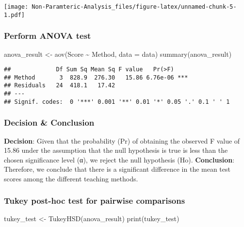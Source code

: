 \documentclass[
]{article}
\newenvironment{Shaded}{\begin{snugshade}}{\end{snugshade}}
\newcommand{\AttributeTok}[1]{\textcolor[rgb]{0.77,0.63,0.00}{#1}}
\newcommand{\FunctionTok}[1]{\textcolor[rgb]{0.00,0.00,0.00}{#1}}
\newcommand{\NormalTok}[1]{#1}
\newcommand{\OtherTok}[1]{\textcolor[rgb]{0.56,0.35,0.01}{#1}}
\newcommand{\SpecialCharTok}[1]{\textcolor[rgb]{0.00,0.00,0.00}{#1}}
\begin{document}
\texttt{[image: Non-Paramteric-Analysis\_files/figure-latex/unnamed-chunk-5-1.pdf]}

\hypertarget{perform-anova-test}{%
\subsubsection{Perform ANOVA test}\label{perform-anova-test}}

\begin{Shaded}
\begin{Highlighting}[]
\NormalTok{anova\_result }\OtherTok{\textless{}{-}} \FunctionTok{aov}\NormalTok{(Score }\SpecialCharTok{\textasciitilde{}}\NormalTok{ Method, }\AttributeTok{data =}\NormalTok{ data)}
\FunctionTok{summary}\NormalTok{(anova\_result)}
\end{Highlighting}
\end{Shaded}

\begin{verbatim}
##             Df Sum Sq Mean Sq F value   Pr(>F)    
## Method       3  828.9  276.30   15.86 6.76e-06 ***
## Residuals   24  418.1   17.42                     
## ---
## Signif. codes:  0 '***' 0.001 '**' 0.01 '*' 0.05 '.' 0.1 ' ' 1
\end{verbatim}

\hypertarget{decision-conclusion}{%
\subsubsection{Decision \& Conclusion}\label{decision-conclusion}}

\textbf{Decision}: Given that the probability (Pr) of obtaining the
observed F value of 15.86 under the assumption that the null hypothesis
is true is less than the chosen significance level (α), we reject the
null hypothesis (Ho). \textbf{Conclusion}: Therefore, we conclude that
there is a significant difference in the mean test scores among the
different teaching methods.

\hypertarget{tukey-post-hoc-test-for-pairwise-comparisons}{%
\subsubsection{Tukey post-hoc test for pairwise
comparisons}\label{tukey-post-hoc-test-for-pairwise-comparisons}}

\begin{Shaded}
\begin{Highlighting}[]
\NormalTok{tukey\_test }\OtherTok{\textless{}{-}} \FunctionTok{TukeyHSD}\NormalTok{(anova\_result)}
\FunctionTok{print}\NormalTok{(tukey\_test)}
\end{Highlighting}
\end{Shaded}
\end{document}
